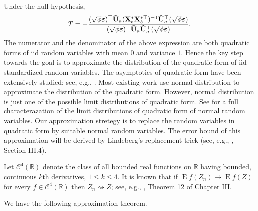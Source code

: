 \documentclass[11pt]{article}
\DeclareMathOperator{\myE}{E}
\theoremstyle{plain}
\theoremstyle{definition}
\theoremstyle{remark}
\begin{document}
Under the null hypothesis,
\begin{equation*}
    T=-\frac{ (\sqrt \phi \boldsymbol{\varepsilon})^\top \tilde {\mathbf{U}}_a (\mathbf{X}_b^* \mathbf{X}_b^{*\top})^{-1} \tilde {\mathbf{U}}_a^\top (\sqrt \phi \boldsymbol{\varepsilon})}{ (\sqrt \phi \boldsymbol{\varepsilon})^\top \tilde {\mathbf{U}}_a  \tilde {\mathbf{U}}_a^\top (\sqrt \phi \boldsymbol{\varepsilon})}.
\end{equation*}
The numerator and the denominator of the above expression are both quadratic forms of iid random variables with mean $0$ and variance $1$.
Hence the key step towards the goal is to approximate the distribution of the quadratic form of iid standardized random variables.
The asymptotics of quadratic form have been extensively studied; see, e.g., \cite{jiang1996reml,Bentkus1996Optimal,Goetze2002,Dicker2015Flexible,Bai2017}.
Most existing work use normal distribution to approximate the distribution of the quadratic form.
However, normal distribution is just one of the possible limit distributions of quadratic form.
See \cite{Sevast1961A} for a full characterazation of the limit distributions of quadratic form of normal random variables.
Our approximation stretegy is to replace the random variables in quadratic form by suitable normal random variables.
The error bound of this approximation will be derived by Lindeberg's replacement trick (see, e.g., \cite{pollard1984convergence}, Section III.4).

Let $\mathscr C^4(\mathbb R)$ denote the class of all bounded real functions on $\mathbb R$ having bounded, continuous $k$th derivatives, $1\leq k\leq 4$.
It is known that if $\myE f(Z_n)\to \myE f(Z)$ for every $f\in \mathscr C^4 (\mathbb R)$ then $Z_n \rightsquigarrow Z$; see, e.g., \cite{pollard1984convergence}, Theorem 12 of Chapter III.




We have the following approximation theorem.
\end{document}
